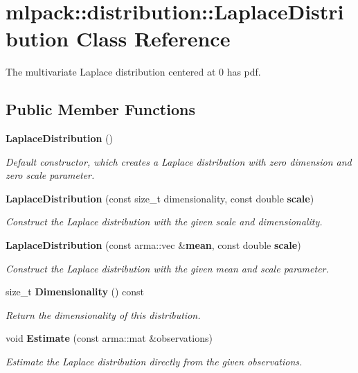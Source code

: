 \section{mlpack\+:\+:distribution\+:\+:Laplace\+Distribution Class Reference}
\label{classmlpack_1_1distribution_1_1LaplaceDistribution}


The multivariate Laplace distribution centered at 0 has pdf.  


\subsection*{Public Member Functions}
\begin{DoxyCompactItemize}
\item 
{\bf Laplace\+Distribution} ()
\begin{DoxyCompactList}\small\item\em Default constructor, which creates a Laplace distribution with zero dimension and zero scale parameter. \end{DoxyCompactList}\item 
{\bf Laplace\+Distribution} (const size\+\_\+t dimensionality, const double {\bf scale})
\begin{DoxyCompactList}\small\item\em Construct the Laplace distribution with the given scale and dimensionality. \end{DoxyCompactList}\item 
{\bf Laplace\+Distribution} (const arma\+::vec \&{\bf mean}, const double {\bf scale})
\begin{DoxyCompactList}\small\item\em Construct the Laplace distribution with the given mean and scale parameter. \end{DoxyCompactList}\item 
size\+\_\+t {\bf Dimensionality} () const 
\begin{DoxyCompactList}\small\item\em Return the dimensionality of this distribution. \end{DoxyCompactList}\item 
void {\bf Estimate} (const arma\+::mat \&observations)
\begin{DoxyCompactList}\small\item\em Estimate the Laplace distribution directly from the given observations. \end{DoxyCompactList}\item 

\end{DoxyCompactItemize}
